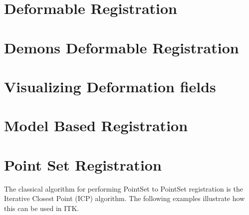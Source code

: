\clearpage

\section{Deformable Registration}
\label{sec:DeformableRegistration}
\ifitkFullVersion

\fi

\clearpage

\section{Demons Deformable Registration}
\label{sec:DemonsDeformableRegistration}
\ifitkFullVersion

\fi

\section{Visualizing Deformation fields}
\label{sec:VisualizingDeformationFields}
\ifitkFullVersion

\fi

\ifitkFullVersion

\fi


\clearpage

\section{Model Based Registration}
\label{sec:ModelBasedRegistration}
\ifitkFullVersion

\fi


\section{Point Set Registration}
\label{sec:PointSetRegistration}

The classical algorithm for performing PointSet to PointSet registration is the
Iterative Closest Point (ICP) algorithm.  The following examples illustrate how
this can be used in ITK.

\ifitkFullVersion

\fi

\ifitkFullVersion

\fi

\ifitkFullVersion

\fi


